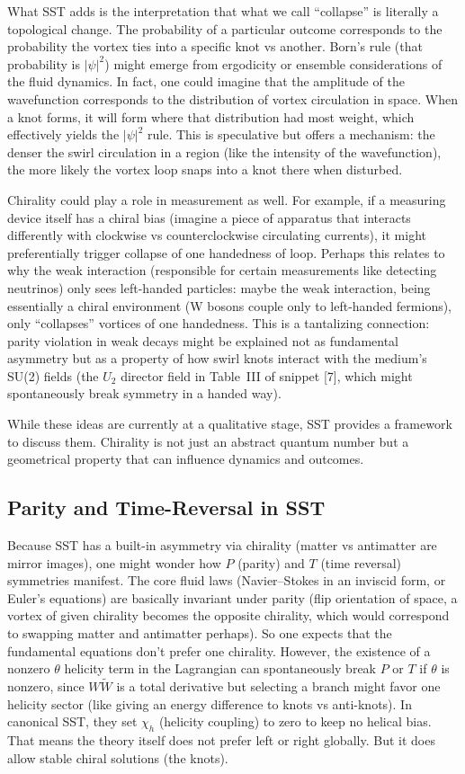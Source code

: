 \documentclass[10pt,reprint,aps,onecolumn,nofootinbib]{revtex4-2}
\begin{document}
What SST adds is the interpretation that what we call ``collapse'' is literally a topological change. The probability of a particular outcome corresponds to the probability the vortex ties into a specific knot vs another. Born’s rule (that probability is $|\psi|^2$) might emerge from ergodicity or ensemble considerations of the fluid dynamics. In fact, one could imagine that the amplitude of the wavefunction corresponds to the distribution of vortex circulation in space. When a knot forms, it will form where that distribution had most weight, which effectively yields the $|\psi|^2$ rule. This is speculative but offers a mechanism: the denser the swirl circulation in a region (like the intensity of the wavefunction), the more likely the vortex loop snaps into a knot there when disturbed.


Chirality could play a role in measurement as well. For example, if a measuring device itself has a chiral bias (imagine a piece of apparatus that interacts differently with clockwise vs counterclockwise circulating currents), it might preferentially trigger collapse of one handedness of loop. Perhaps this relates to why the weak interaction (responsible for certain measurements like detecting neutrinos) only sees left-handed particles: maybe the weak interaction, being essentially a chiral environment (W bosons couple only to left-handed fermions), only ``collapses'' vortices of one handedness. This is a tantalizing connection: parity violation in weak decays might be explained not as fundamental asymmetry but as a property of how swirl knots interact with the medium’s SU(2) fields (the $U_2$ director field in Table~III of snippet [7], which might spontaneously break symmetry in a handed way).


While these ideas are currently at a qualitative stage, SST provides a framework to discuss them. Chirality is not just an abstract quantum number but a geometrical property that can influence dynamics and outcomes.


\subsection{Parity and Time-Reversal in SST}

Because SST has a built-in asymmetry via chirality (matter vs antimatter are mirror images), one might wonder how $P$ (parity) and $T$ (time reversal) symmetries manifest. The core fluid laws (Navier–Stokes in an inviscid form, or Euler’s equations) are basically invariant under parity (flip orientation of space, a vortex of given chirality becomes the opposite chirality, which would correspond to swapping matter and antimatter perhaps). So one expects that the fundamental equations don’t prefer one chirality. However, the existence of a nonzero $\theta$ helicity term in the Lagrangian can spontaneously break $P$ or $T$ if $\theta$ is nonzero, since $W\tilde{W}$ is a total derivative but selecting a branch might favor one helicity sector (like giving an energy difference to knots vs anti-knots). In canonical SST, they set $\chi_h$ (helicity coupling) to zero to keep no helical bias. That means the theory itself does not prefer left or right globally. But it does allow stable chiral solutions (the knots).
\end{document}

